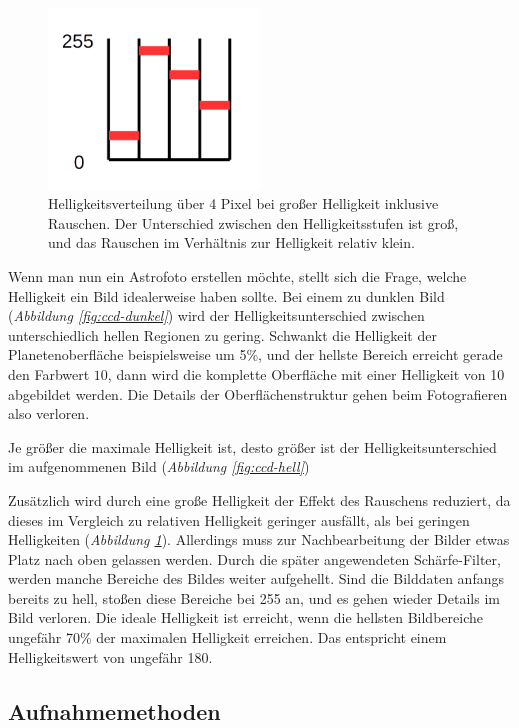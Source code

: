 \documentclass[10pt,a4paper,titlepage]{article}
\begin{document}
\begin{figure}[h!]
  \centering
    \includegraphics[width=0.5\textwidth]{CCD_Rauschen}
  \caption{Helligkeitsverteilung über 4 Pixel bei großer Helligkeit inklusive Rauschen. Der Unterschied zwischen den Helligkeitsstufen ist groß, und das Rauschen im Verhältnis zur Helligkeit relativ klein.}
  \label{fig:ccd-rauschen}
\end{figure}

Wenn man nun ein Astrofoto erstellen möchte, stellt sich die Frage, welche Helligkeit ein Bild idealerweise haben sollte. Bei einem zu dunklen Bild (\textit{Abbildung \ref{fig:ccd-dunkel}}) wird der Helligkeitsunterschied zwischen unterschiedlich hellen Regionen zu gering. Schwankt die Helligkeit der Planetenoberfläche beispielsweise um 5\%, und der hellste Bereich erreicht gerade den Farbwert $10$, dann wird die komplette Oberfläche mit einer Helligkeit von 10 abgebildet werden. Die Details der Oberflächenstruktur gehen beim Fotografieren also verloren.

Je größer die maximale Helligkeit ist, desto größer ist der Helligkeitsunterschied im aufgenommenen Bild (\textit{Abbildung \ref{fig:ccd-hell}})

Zusätzlich wird durch eine große Helligkeit der Effekt des Rauschens reduziert, da dieses im Vergleich zu relativen Helligkeit geringer ausfällt, als bei geringen Helligkeiten (\textit{Abbildung \ref{fig:ccd-rauschen}}). Allerdings muss zur Nachbearbeitung der Bilder etwas Platz nach oben gelassen werden. Durch die später angewendeten Schärfe-Filter, werden manche Bereiche des Bildes weiter aufgehellt. Sind die Bilddaten anfangs bereits zu hell, stoßen diese Bereiche bei 255 an, und es gehen wieder Details im Bild verloren. Die ideale Helligkeit ist erreicht, wenn die hellsten Bildbereiche ungefähr 70\% der maximalen Helligkeit erreichen. Das entspricht einem Helligkeitswert von ungefähr 180.

\subsection{Aufnahmemethoden}
\end{document}
